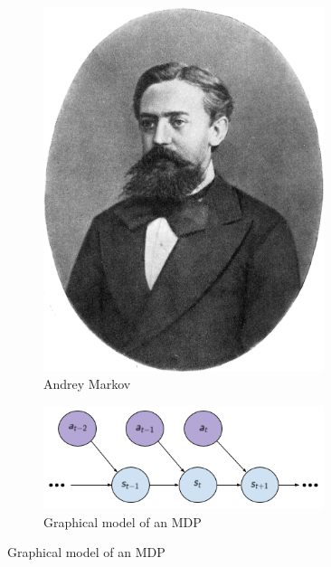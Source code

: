 \begin{frame}
    \begin{figure}
        \centering
        \begin{subfigure}{0.18\textwidth}
            \centering
            \includegraphics[width=0.9\textwidth]{./imgs/img_rl_mdp_andrey_markov.png}
            \caption{Andrey Markov}
        \end{subfigure}
        \hspace{0.1\textwidth}
        \begin{subfigure}{0.4\textwidth}
            \centering
            \includegraphics[width=0.9\textwidth]{./imgs/img_rl_mdp_graphical_model.png}
            \caption{Graphical model of an MDP}
        \end{subfigure}
    \end{figure}
\end{frame}

